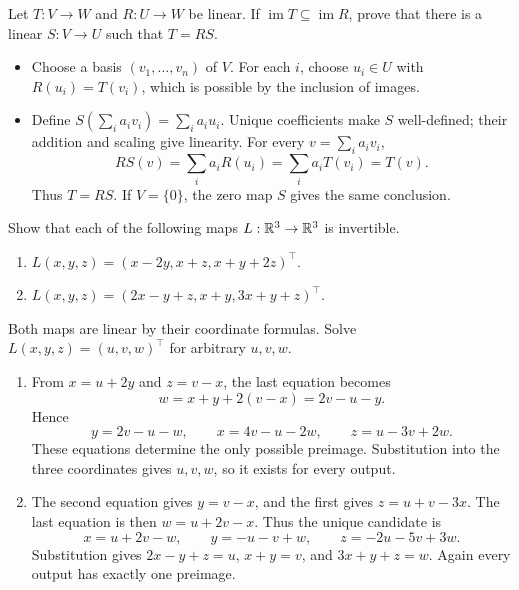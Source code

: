 \begin{problem}\label{ex:04:factor-map}
Let \(T:V\to W\) and \(R:U\to W\) be linear.
If \(\operatorname{im}T\subseteq\operatorname{im}R\), prove that
there is a linear \(S:V\to U\) such that \(T=RS\).
\end{problem}
\begin{solution}
\begin{itemize}
\item Choose a basis \((v_1,\ldots,v_n)\) of \(V\).
For each \(i\), choose \(u_i\in U\) with \(R(u_i)=T(v_i)\),
which is possible by the inclusion of images.
\item Define \(S(\sum_i a_iv_i)=\sum_i a_iu_i\).
Unique coefficients make \(S\) well-defined; their addition and scaling
give linearity. For every \(v=\sum_i a_iv_i\),
\[
RS(v)=\sum_i a_iR(u_i)=\sum_i a_iT(v_i)=T(v).
\]
Thus \(T=RS\). If \(V=\{0\}\), the zero map \(S\) gives the same conclusion.
\end{itemize}
\end{solution}

\begin{problem}\label{ex:04:invertible-maps}
Show that each of the following maps \(L:\mathbb R^3\to\mathbb R^3\) is invertible.
\begin{enumerate}
\item \(L(x,y,z)=(x-2y,x+z,x+y+2z)^\top\).
\item \(L(x,y,z)=(2x-y+z,x+y,3x+y+z)^\top\).
\end{enumerate}
\end{problem}
\begin{solution}
Both maps are linear by their coordinate formulas.
Solve \(L(x,y,z)=(u,v,w)^\top\) for arbitrary \(u,v,w\).
\begin{enumerate}
\item From \(x=u+2y\) and \(z=v-x\), the last equation becomes
\[
w=x+y+2(v-x)=2v-u-y.
\]
Hence
\[
y=2v-u-w,\qquad x=4v-u-2w,\qquad z=u-3v+2w.
\]
These equations determine the only possible preimage. Substitution into
the three coordinates gives \(u,v,w\), so it exists for every output.
\item The second equation gives \(y=v-x\), and the first gives
\(z=u+v-3x\). The last equation is then \(w=u+2v-x\).
Thus the unique candidate is
\[
x=u+2v-w,\qquad y=-u-v+w,\qquad z=-2u-5v+3w.
\]
Substitution gives \(2x-y+z=u\), \(x+y=v\), and \(3x+y+z=w\).
Again every output has exactly one preimage.
\end{enumerate}
\end{solution}

